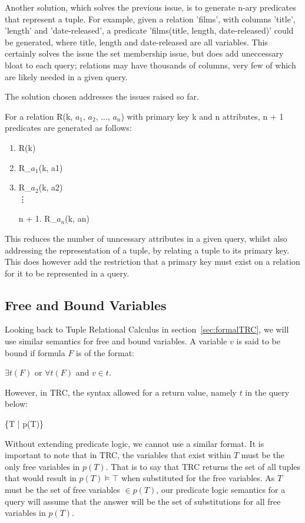 \documentclass[a4paper, 11pt]{article}
\begin{document}
      Another solution, which solves the previous issue, is to generate n-ary
      predicates that represent a tuple. For example, given a relation 'films',
      with columns 'title', 'length' and 'date-released', a predicate
      'films(title, length, date-released)' could be generated, where title,
      length and date-released are all variables. This certainly solves the
      issue the set membership issue, but does add uneccessary bloat to each
      query; relations may have thousands of columns, very few of which are
      likely needed in a given query.

      The solution chosen addresses the issues raised so far.

      For a relation R(k, $a_{1}$, $a_{2}$, ..., $a_{n}$) with primary key k
      and n attributes, n + 1 predicates are generated as follows:
      \begin{enumerate}
        \item R(k)
        \item R\_$a_{1}$(k, a1)
        \item R\_$a_{2}$(k, a2)
        \\ \vdots
        \item[n + 1.] R\_$a_{n}$(k, an)
      \end{enumerate}

      This reduces the number of unncessary attributes in a given query, whilst
      also addressing the representation of a tuple, by relating a tuple to its
      primary key. This does however add the restriction that a primary key
      must exist on a relation for it to be represented in a query.

    \subsection{Free and Bound Variables}

      Looking back to Tuple Relational Calculus in
      section~\ref{sec:formalTRC}, we will use similar semantics for free and
      bound variables. A variable $v$ is said to be bound if formula $F$ is of
      the format:

      $\exists t(F)$ or $\forall t(F)$ and $v \in t$.

      However, in TRC, the syntax allowed for a return value, namely $t$ in the
      query below:

      \{T | p(T)\}

      Without extending predicate logic, we cannot use a similar format.
      It is important to note that in TRC, the variables that exist
      within $T$ must be the only free variables in $p(T)$. That is to say that
      TRC returns the set of all tuples that would result in $p(T) \models
      \top$ when substituted for the free variables. As $T$ must be the set of
      free variables $\in p(T)$, our predicate logic semantics for a query will
      assume that the answer will be the set of substitutions for all free
      variables in $p(T)$.
\end{document}
